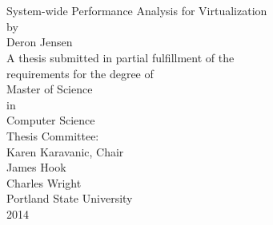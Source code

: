 \begin{titlepage}
\begin{centering}
 \\
 \\
System-wide Performance Analysis for Virtualization \\
\vspace{6\baselineskip}\vspace{-\parskip}
by \\
\vspace{1\baselineskip}\vspace{-\parskip}
Deron Jensen \\
\vspace{6\baselineskip}\vspace{-\parskip}
A thesis submitted in partial fulfillment of the \\
requirements for the degree of \\
\vspace{3\baselineskip}\vspace{-\parskip}
Master of Science \\
in \\
Computer Science \\
\vspace{3\baselineskip}\vspace{-\parskip}
Thesis Committee: \\
Karen Karavanic, Chair \\
James Hook \\
Charles Wright \\
\vspace{3\baselineskip}\vspace{-\parskip}
Portland State University \\
2014\\
\end{centering}
\end{titlepage}
